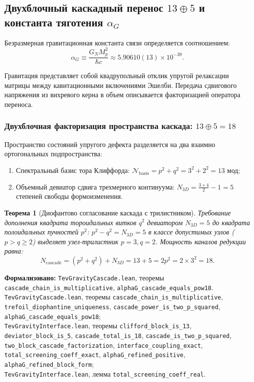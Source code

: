 \documentclass[11pt,a4paper]{article}
\newtheorem{theorem}{Теорема}
\theoremstyle{definition}
\theoremstyle{remark}
\begin{document}
\subsection{Двухблочный каскадный перенос $13 \oplus 5$ и константа тяготения $\alpha_G$}

Безразмерная гравитационная константа связи определяется соотношением:
\begin{equation}
	\alpha_G \equiv \frac{G_N M_p^2}{\hbar c} \approx 5.90610(13) \times 10^{-39}.
\label{eq:alpha_G_definition_ratio}
\end{equation}

Гравитация представляет собой квадрупольный отклик упругой релаксации матрицы между кавитационными включениями Эшелби. Передача сдвигового напряжения из вихревого керна в объем описывается факторизацией оператора переноса.

\subsubsection{Двухблочная факторизация пространства каскада: $13 \oplus 5 = 18$}

Пространство состояний упругого дефекта разделяется на два взаимно ортогональных подпространства:
\begin{enumerate}
\item Спектральный базис тора Клиффорда: $\mathcal{N}_{\mathrm{basis}} = p^2 + q^2 = 3^2 + 2^2 = 13$ мод;
\item Объемный девиатор сдвига трехмерного континуума: $N_{3D} = \frac{3 \times 4}{2} - 1 = 5$ степеней свободы формоизменения.
\end{enumerate}

\begin{theorem}[Диофантово согласование каскада с трилистником]
\label{thm:diophantine_cascade_trefoil}
Требование дополнения квадрата тороидальных витков $q^2$ девиатором $N_{3D} = 5$ до квадрата полоидальных пучностей $p^2$: $p^2 - q^2 = N_{3D} = 5$ в классе допустимых узлов ($p > q \ge 2$) выделяет узел-трилистник $p = 3, q = 2$. Мощность каналов редукции равна:
\begin{equation}
	N_{\mathrm{cascade}} = (p^2 + q^2) + N_{3D} = 13 + 5 = 2p^2 = 2 \times 3^2 = 18.
\label{eq:cascade_power_eighteen}
\end{equation}
\end{theorem}

\noindent\small\textbf{Формализовано:} \texttt{TevGravityCascade.lean}, теоремы \texttt{cascade_chain_is_multiplicative}, \texttt{alphaG_cascade_equals_pow18}.
\texttt{TevGravityCascade.lean}, теоремы \texttt{cascade_chain_is_multiplicative}, \texttt{trefoil_diophantine_uniqueness}, \texttt{cascade_power_is_two_p_squared}, \texttt{alphaG_cascade_equals_pow18};\\ \texttt{TevGravityInterface.lean}, теоремы \texttt{clifford_block_is_13}, \texttt{deviator_block_is_5}, \texttt{cascade_total_is_18}, \texttt{cascade_is_two_p_squared}, \texttt{two_block_cascade_factorization}, \texttt{interface_coupling_exact}, \texttt{total_screening_coeff_exact}, \texttt{alphaG_refined_positive}, \texttt{alphaG_refined_block_form};\\ \texttt{TevGravityInterface.lean}, лемма \texttt{total_screening_coeff_real}.
\end{document}
